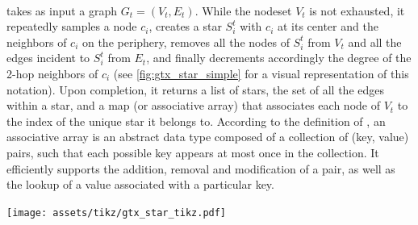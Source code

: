 \paragraph{\extractStar{}}\label{par:extractstar}%
\extractStar{} takes as input a graph $G_t=(V_t, E_t)$.
While the nodeset $V_t$ is not exhausted, it repeatedly samples a
node $c_i$, creates a star $S_i^t$ with $c_i$ at its center and the neighbors of $c_i$ on the
periphery, removes all the nodes of $S_i^t$ from
$V_t$ and all the edges incident to $S_i^t$ from $E_t$, and finally decrements accordingly the
degree of the 2-hop neighbors of $c_i$ (see \autoref{fig:gtx_star_simple} for a visual
representation of this notation).
Upon completion, it returns a list of stars,
the set of all the edges within a star,
and a map (or associative array) that associates each node of $V_t$ to the index of the
unique star it belongs to.
According to the definition of \textcite{HashTableBook08}, an associative array is an abstract data
type composed of a collection of (key, value) pairs, such that each possible key appears at most
once in the collection. It efficiently supports the addition, removal and modification of a pair, as
well as the lookup of a value associated with a particular key.
\begin{marginfigure}
  \centering
  \texttt{[image: assets/tikz/gtx\_star\_tikz.pdf]}
  \caption[A sample star]{A sample star created during the \tth{} collapse level. The black node
    is the center $c_i$ of the star $S_i^t$, which is also made of the four light gray peripheral nodes
  as well as the solid edges. The 2-hops neighbors of $c_i$ are the white nodes
  $h_1$ to $h_3$, whose degree will decrease once $S_i^t$ is removed from $G_t$.}
  \label{fig:gtx_star_simple}
\end{marginfigure}

